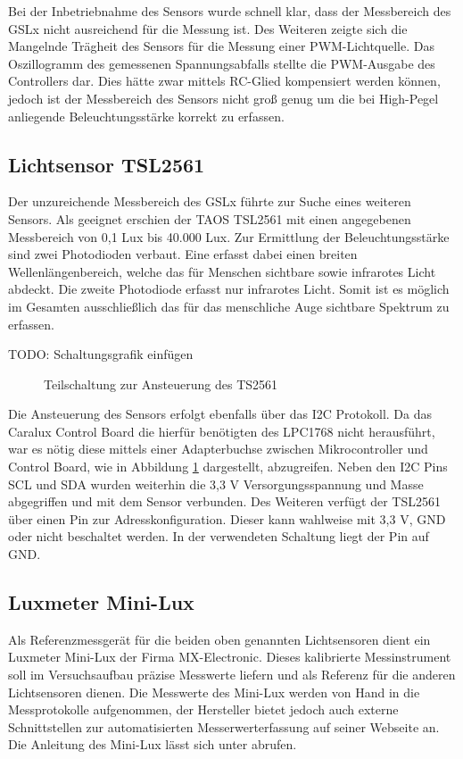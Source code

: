 \documentclass[a4paper,12pt]{scrartcl}
\begin{document}
Bei der Inbetriebnahme des Sensors wurde schnell klar, dass der Messbereich des GSLx nicht ausreichend für die Messung ist. Des Weiteren zeigte sich die Mangelnde Trägheit des Sensors für die Messung einer PWM-Lichtquelle. Das Oszillogramm des gemessenen Spannungsabfalls stellte die PWM-Ausgabe des Controllers dar. Dies hätte zwar mittels RC-Glied kompensiert werden können, jedoch ist der Messbereich des Sensors nicht groß genug um die bei High-Pegel anliegende Beleuchtungsstärke korrekt zu erfassen.

\subsection{Lichtsensor TSL2561}

Der unzureichende Messbereich des GSLx führte zur Suche eines weiteren Sensors. Als geeignet erschien der TAOS TSL2561 mit einen angegebenen Messbereich von 0,1 Lux bis 40.000 Lux. Zur Ermittlung der Beleuchtungsstärke sind zwei Photodioden verbaut. Eine erfasst dabei einen breiten Wellenlängenbereich, welche das für Menschen sichtbare sowie infrarotes Licht abdeckt. Die zweite Photodiode erfasst nur infrarotes Licht. Somit ist es möglich im Gesamten ausschließlich das für das menschliche Auge sichtbare Spektrum zu erfassen.

TODO: Schaltungsgrafik einfügen

\begin{figure}[htb]
\begin{center}
\end{center}
\caption[Teilschaltung zur Ansteuerung des TS2561, Quelle: Autoren]{\label{fig:schaltungTSL}Teilschaltung zur Ansteuerung des TS2561}
\end{figure}

Die Ansteuerung des Sensors erfolgt ebenfalls über das I2C Protokoll. Da das Caralux Control Board die hierfür benötigten des LPC1768 nicht herausführt, war es nötig diese mittels einer Adapterbuchse zwischen Mikrocontroller und Control Board, wie in Abbildung \ref{fig:schaltungTSL} dargestellt, abzugreifen. Neben den I2C Pins SCL und SDA wurden weiterhin die 3,3 V Versorgungsspannung und Masse abgegriffen und mit dem Sensor verbunden. Des Weiteren verfügt der TSL2561 über einen Pin zur Adresskonfiguration. Dieser kann wahlweise mit 3,3 V, GND oder nicht beschaltet werden. In der verwendeten Schaltung liegt der Pin auf GND.

\subsection{Luxmeter Mini-Lux}
Als Referenzmessgerät für die beiden oben genannten Lichtsensoren dient ein Luxmeter Mini-Lux der Firma MX-Electronic. Dieses kalibrierte Messinstrument soll im Versuchsaufbau präzise Messwerte liefern und als Referenz für die anderen Lichtsensoren dienen. Die Messwerte des Mini-Lux werden von Hand in die Messprotokolle aufgenommen, der Hersteller bietet jedoch auch externe Schnittstellen zur automatisierten Messerwerterfassung auf seiner Webseite an. Die Anleitung des Mini-Lux lässt sich unter \cite{specminilux} abrufen. 
\end{document}
